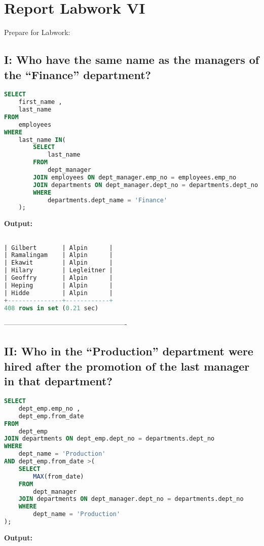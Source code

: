 \documentclass[12pt]{report}
\begin{document}
\section*{Report Labwork VI}

Prepare for Labwork:

{\small
{}}

\subsection*{I: Who have the same name as the managers of the “Finance” department?}

\begin{lstlisting}[language=sql]
SELECT
	first_name ,
	last_name
FROM
	employees
WHERE
	last_name IN(
		SELECT
			last_name
		FROM
			dept_manager
		JOIN employees ON dept_manager.emp_no = employees.emp_no
		JOIN departments ON dept_manager.dept_no = departments.dept_no
		WHERE
			departments.dept_name = 'Finance'
	);
\end{lstlisting}


\textbf{Output:}

\begin{lstlisting}[language=sql]

| Gilbert       | Alpin      |
| Ramalingam    | Alpin      |
| Ekawit        | Alpin      |
| Hilary        | Legleitner |
| Geoffry       | Alpin      |
| Heping        | Alpin      |
| Hidde         | Alpin      |
+---------------+------------+
408 rows in set (0.21 sec)
\end{lstlisting}
----------------------------------------------------


\subsection*{II: Who in the “Production” department were hired after the promotion of the last manager in that department?}

\begin{lstlisting}[language=sql]
SELECT
	dept_emp.emp_no ,
	dept_emp.from_date
FROM
	dept_emp
JOIN departments ON dept_emp.dept_no = departments.dept_no
WHERE
	dept_name = 'Production'
AND dept_emp.from_date >(
	SELECT
		MAX(from_date)
	FROM
		dept_manager
	JOIN departments ON dept_manager.dept_no = departments.dept_no
	WHERE
		dept_name = 'Production'
);
\end{lstlisting}


\textbf{Output:}
\end{document}

